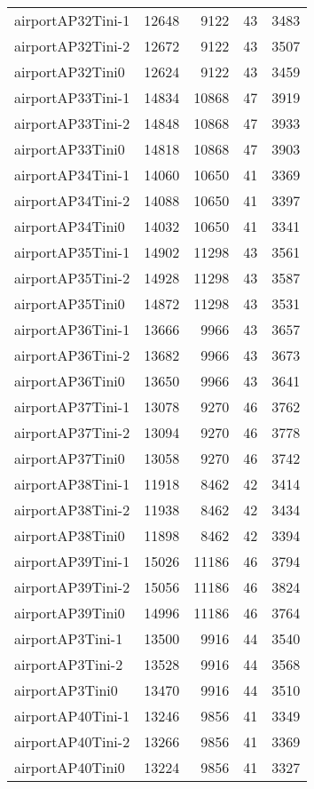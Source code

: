 \begin{longtable}{lrrrr}
airportAP32Tini-1 & 12648 & 9122 & 43 & 3483 \\
airportAP32Tini-2 & 12672 & 9122 & 43 & 3507 \\
airportAP32Tini0 & 12624 & 9122 & 43 & 3459 \\
airportAP33Tini-1 & 14834 & 10868 & 47 & 3919 \\
airportAP33Tini-2 & 14848 & 10868 & 47 & 3933 \\
airportAP33Tini0 & 14818 & 10868 & 47 & 3903 \\
airportAP34Tini-1 & 14060 & 10650 & 41 & 3369 \\
airportAP34Tini-2 & 14088 & 10650 & 41 & 3397 \\
airportAP34Tini0 & 14032 & 10650 & 41 & 3341 \\
airportAP35Tini-1 & 14902 & 11298 & 43 & 3561 \\
airportAP35Tini-2 & 14928 & 11298 & 43 & 3587 \\
airportAP35Tini0 & 14872 & 11298 & 43 & 3531 \\
airportAP36Tini-1 & 13666 & 9966 & 43 & 3657 \\
airportAP36Tini-2 & 13682 & 9966 & 43 & 3673 \\
airportAP36Tini0 & 13650 & 9966 & 43 & 3641 \\
airportAP37Tini-1 & 13078 & 9270 & 46 & 3762 \\
airportAP37Tini-2 & 13094 & 9270 & 46 & 3778 \\
airportAP37Tini0 & 13058 & 9270 & 46 & 3742 \\
airportAP38Tini-1 & 11918 & 8462 & 42 & 3414 \\
airportAP38Tini-2 & 11938 & 8462 & 42 & 3434 \\
airportAP38Tini0 & 11898 & 8462 & 42 & 3394 \\
airportAP39Tini-1 & 15026 & 11186 & 46 & 3794 \\
airportAP39Tini-2 & 15056 & 11186 & 46 & 3824 \\
airportAP39Tini0 & 14996 & 11186 & 46 & 3764 \\
airportAP3Tini-1 & 13500 & 9916 & 44 & 3540 \\
airportAP3Tini-2 & 13528 & 9916 & 44 & 3568 \\
airportAP3Tini0 & 13470 & 9916 & 44 & 3510 \\
airportAP40Tini-1 & 13246 & 9856 & 41 & 3349 \\
airportAP40Tini-2 & 13266 & 9856 & 41 & 3369 \\
airportAP40Tini0 & 13224 & 9856 & 41 & 3327 \\

\end{longtable}
